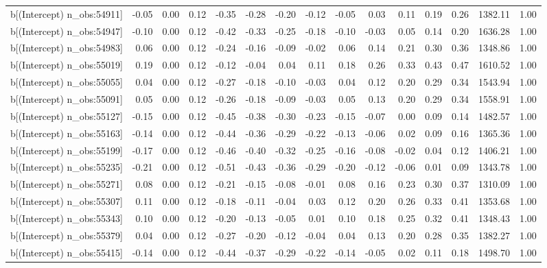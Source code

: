 \begin{table}[ht]
\begin{tabular}{rrrrrrrrrrrrrrr}
  b[(Intercept) n\_obs:54911] & -0.05 & 0.00 & 0.12 & -0.35 & -0.28 & -0.20 & -0.12 & -0.05 & 0.03 & 0.11 & 0.19 & 0.26 & 1382.11 & 1.00 \\ 
  b[(Intercept) n\_obs:54947] & -0.10 & 0.00 & 0.12 & -0.42 & -0.33 & -0.25 & -0.18 & -0.10 & -0.03 & 0.05 & 0.14 & 0.20 & 1636.28 & 1.00 \\ 
  b[(Intercept) n\_obs:54983] & 0.06 & 0.00 & 0.12 & -0.24 & -0.16 & -0.09 & -0.02 & 0.06 & 0.14 & 0.21 & 0.30 & 0.36 & 1348.86 & 1.00 \\ 
  b[(Intercept) n\_obs:55019] & 0.19 & 0.00 & 0.12 & -0.12 & -0.04 & 0.04 & 0.11 & 0.18 & 0.26 & 0.33 & 0.43 & 0.47 & 1610.52 & 1.00 \\ 
  b[(Intercept) n\_obs:55055] & 0.04 & 0.00 & 0.12 & -0.27 & -0.18 & -0.10 & -0.03 & 0.04 & 0.12 & 0.20 & 0.29 & 0.34 & 1543.94 & 1.00 \\ 
  b[(Intercept) n\_obs:55091] & 0.05 & 0.00 & 0.12 & -0.26 & -0.18 & -0.09 & -0.03 & 0.05 & 0.13 & 0.20 & 0.29 & 0.34 & 1558.91 & 1.00 \\ 
  b[(Intercept) n\_obs:55127] & -0.15 & 0.00 & 0.12 & -0.45 & -0.38 & -0.30 & -0.23 & -0.15 & -0.07 & 0.00 & 0.09 & 0.14 & 1482.57 & 1.00 \\ 
  b[(Intercept) n\_obs:55163] & -0.14 & 0.00 & 0.12 & -0.44 & -0.36 & -0.29 & -0.22 & -0.13 & -0.06 & 0.02 & 0.09 & 0.16 & 1365.36 & 1.00 \\ 
  b[(Intercept) n\_obs:55199] & -0.17 & 0.00 & 0.12 & -0.46 & -0.40 & -0.32 & -0.25 & -0.16 & -0.08 & -0.02 & 0.04 & 0.12 & 1406.21 & 1.00 \\ 
  b[(Intercept) n\_obs:55235] & -0.21 & 0.00 & 0.12 & -0.51 & -0.43 & -0.36 & -0.29 & -0.20 & -0.12 & -0.06 & 0.01 & 0.09 & 1343.78 & 1.00 \\ 
  b[(Intercept) n\_obs:55271] & 0.08 & 0.00 & 0.12 & -0.21 & -0.15 & -0.08 & -0.01 & 0.08 & 0.16 & 0.23 & 0.30 & 0.37 & 1310.09 & 1.00 \\ 
  b[(Intercept) n\_obs:55307] & 0.11 & 0.00 & 0.12 & -0.18 & -0.11 & -0.04 & 0.03 & 0.12 & 0.20 & 0.26 & 0.33 & 0.41 & 1353.68 & 1.00 \\ 
  b[(Intercept) n\_obs:55343] & 0.10 & 0.00 & 0.12 & -0.20 & -0.13 & -0.05 & 0.01 & 0.10 & 0.18 & 0.25 & 0.32 & 0.41 & 1348.43 & 1.00 \\ 
  b[(Intercept) n\_obs:55379] & 0.04 & 0.00 & 0.12 & -0.27 & -0.20 & -0.12 & -0.04 & 0.04 & 0.13 & 0.20 & 0.28 & 0.35 & 1382.27 & 1.00 \\ 
  b[(Intercept) n\_obs:55415] & -0.14 & 0.00 & 0.12 & -0.44 & -0.37 & -0.29 & -0.22 & -0.14 & -0.05 & 0.02 & 0.11 & 0.18 & 1498.70 & 1.00 \\ 

\end{tabular}
\end{table}
